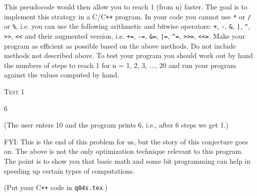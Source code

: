 This pseudocode would then allow you to reach 1 (from n) faster.
The goal is to implement this strategy in a C/C\texttt{++} program.
In your code you cannot use \verb!*! or \verb!/! or \verb!%!,
i.e.
you can use the following arithmetic and bitwise operators:
\verb!+!, \verb!-!,
\verb!&!, \verb!|!, \verb!^!, \verb!>>!, \verb!<<! and their augmented
version, i.e.
\verb!+=!, \verb!-=!, \verb!&=!, \verb!|=!, \verb!^=!, \verb!>>=!, \verb!<<=!.
Make your program as efficient as possible based on the above
methods. Do not include methods not described above.
To test your program you should work out by
hand the numbers of steps to reach 1 for n = 1, 2, 3, ..., 20
and run your program against the values
computed by hand.

\textsc{Test 1}
\begin{console}[commandchars=\\\{\}]
6
\end{console}
(The user enters 10 and the program prints 6, i.e., after 6 steps we get 1.)

FYI: This is the end of this problem for us, but the story of this conjecture
goes on. The above is not
the only optimization technique relevant to this program.
The point is to show you that basic math and
some bit programming can help in speeding up certain types of computations.

(Put your C\texttt{++} code in \verb!q04s.tex!.)
